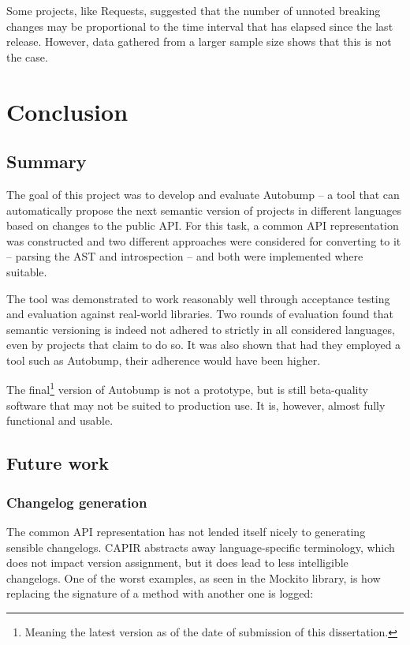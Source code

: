 \documentclass{l4proj}
\begin{document}
Some projects, like Requests, suggested that the number of unnoted
breaking changes may be proportional to the time interval that has
elapsed since the last release. However, data gathered from a larger
sample size shows that this is not the case.

\chapter{Conclusion}
\label{Conclusion}

\section{Summary}

The goal of this project was to develop and evaluate Autobump -- a
tool that can automatically propose the next semantic version of
projects in different languages based on changes to the public API.
For this task, a common API representation was constructed and two
different approaches were considered for converting to it -- parsing
the AST and introspection -- and both were implemented where suitable.

The tool was demonstrated to work reasonably well through acceptance
testing and evaluation against real-world libraries. Two rounds of
evaluation found that semantic versioning is indeed not adhered to
strictly in all considered languages, even by projects that claim to
do so. It was also shown that had they employed a tool such as
Autobump, their adherence would have been higher.

The final\footnote{Meaning the latest version as of the date of
submission of this dissertation.} version of Autobump
\cite{AutobumpRepository} is not a prototype, but is still
beta-quality software that may not be suited to production use. It is,
however, almost fully functional and usable.

\section{Future work}

\subsection{Changelog generation}

The common API representation has not lended itself nicely to
generating sensible changelogs. CAPIR abstracts away language-specific
terminology, which does not impact version assignment, but it does
lead to less intelligible changelogs. One of the worst examples, as
seen in the Mockito library, is how replacing the signature of a
method with another one is logged:
\end{document}
